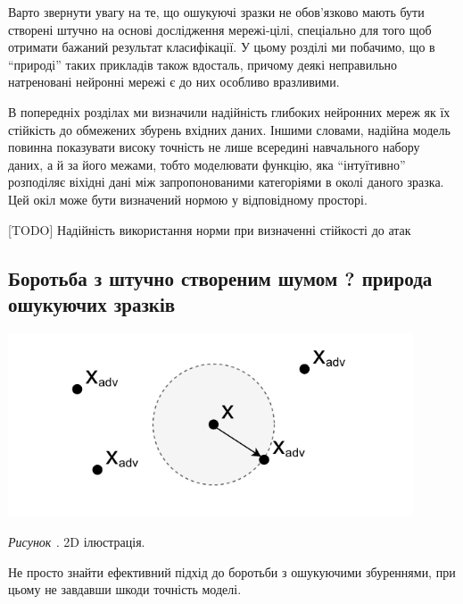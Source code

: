 \documentclass[14pt,a4paper]{extarticle}
\newcounter{e}
\newcounter{pic}
\newcommand{\pic}[1]{\refstepcounter{pic} \vspace{-0.3cm}\textit{Рисунок \arabic{pic}\label{#1}.}}
\numberwithin{equation}{section}
\numberwithin{figure}{section}
\begin{document}
 Варто звернути увагу на те, що ошукуючі зразки не обов'язково мають бути створені штучно на основі дослідження мережі-цілі, спеціально для того щоб отримати бажаний результат класифікації. У цьому розділі ми побачимо, що в ``природі'' таких прикладів також вдосталь, причому деякі неправильно натреновані нейронні мережі є до них особливо вразливими. 
 
 В попередніх розділах ми визначили надійність глибоких нейронних мереж як їх стійкість до обмежених збурень вхідних даних. Іншими словами, надійна модель повинна показувати високу точність не лише всередині навчального набору даних, а й за його межами, тобто моделювати функцію, яка ``інтуїтивно'' розподіляє віхідні дані між запропонованими категоріями в околі даного зразка. Цей окіл може бути визначений нормою у відповідному просторі.

 [TODO]
 \cite{analysis-of-robustness}
 Надійність використання норми при визначенні стійкості до атак 


 

 
 
 
 \subsection{Боротьба з штучно створеним шумом ? природа ошукуючих зразків}
 \begin{center}
 	\includegraphics[width=12cm]{../images/2Dball.pdf}
 \end{center}
 \begin{center}
 	\pic{domain} 2D ілюстрація.
 \end{center}
 Не просто  знайти ефективний підхід до боротьби з ошукуючими збуреннями, при цьому не завдавши шкоди точність моделі.
 
\end{document}
